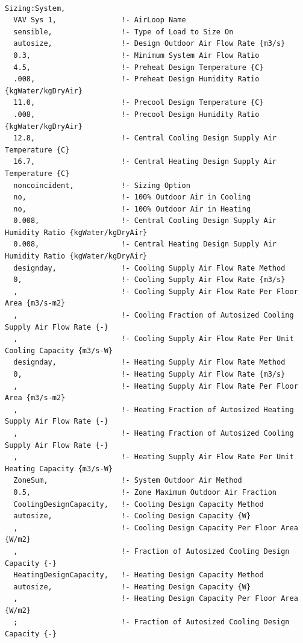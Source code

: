 \begin{lstlisting}

Sizing:System,
  VAV Sys 1,               !- AirLoop Name
  sensible,                !- Type of Load to Size On
  autosize,                !- Design Outdoor Air Flow Rate {m3/s}
  0.3,                     !- Minimum System Air Flow Ratio
  4.5,                     !- Preheat Design Temperature {C}
  .008,                    !- Preheat Design Humidity Ratio {kgWater/kgDryAir}
  11.0,                    !- Precool Design Temperature {C}
  .008,                    !- Precool Design Humidity Ratio {kgWater/kgDryAir}
  12.8,                    !- Central Cooling Design Supply Air Temperature {C}
  16.7,                    !- Central Heating Design Supply Air Temperature {C}
  noncoincident,           !- Sizing Option
  no,                      !- 100% Outdoor Air in Cooling
  no,                      !- 100% Outdoor Air in Heating
  0.008,                   !- Central Cooling Design Supply Air Humidity Ratio {kgWater/kgDryAir}
  0.008,                   !- Central Heating Design Supply Air Humidity Ratio {kgWater/kgDryAir}
  designday,               !- Cooling Supply Air Flow Rate Method
  0,                       !- Cooling Supply Air Flow Rate {m3/s}
  ,                        !- Cooling Supply Air Flow Rate Per Floor Area {m3/s-m2}
  ,                        !- Cooling Fraction of Autosized Cooling Supply Air Flow Rate {-}
  ,                        !- Cooling Supply Air Flow Rate Per Unit Cooling Capacity {m3/s-W}
  designday,               !- Heating Supply Air Flow Rate Method
  0,                       !- Heating Supply Air Flow Rate {m3/s}
  ,                        !- Heating Supply Air Flow Rate Per Floor Area {m3/s-m2}
  ,                        !- Heating Fraction of Autosized Heating Supply Air Flow Rate {-}
  ,                        !- Heating Fraction of Autosized Cooling Supply Air Flow Rate {-}
  ,                        !- Heating Supply Air Flow Rate Per Unit Heating Capacity {m3/s-W}
  ZoneSum,                 !- System Outdoor Air Method
  0.5,                     !- Zone Maximum Outdoor Air Fraction
  CoolingDesignCapacity,   !- Cooling Design Capacity Method
  autosize,                !- Cooling Design Capacity {W}
  ,                        !- Cooling Design Capacity Per Floor Area {W/m2}
  ,                        !- Fraction of Autosized Cooling Design Capacity {-}
  HeatingDesignCapacity,   !- Heating Design Capacity Method
  autosize,                !- Heating Design Capacity {W}
  ,                        !- Heating Design Capacity Per Floor Area {W/m2}
  ;                        !- Fraction of Autosized Cooling Design Capacity {-}
\end{lstlisting}

